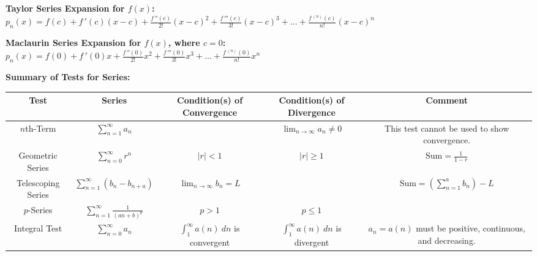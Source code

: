 \noindent\textbf{\large Taylor Series Expansion for $f(x)$:}\\[5pt]
\noindent$\displaystyle p_n(x) = f(c) + f\,'(c)(x-c) + \frac{f\,''(c)}{2!}(x-c)^2 + \frac{f\,'''(c)}{3!}(x-c)^3 + ... + \frac{f\,^{(n)}(c)}{n!}(x-c)^n
$
\baselineskip

\noindent\textbf{\large Maclaurin Series Expansion for $f(x)$, where $c=0$:}\\[5pt]
\noindent$\displaystyle p_n(x) = f(0) + f\,'(0)x + \frac{f\,''(0)}{2!}x^2 + \frac{f\,'''(0)}{3!}x^3 + ... + \frac{f\,^{(n)}(0)}{n!}x^n
$

\clearpage

\noindent\textbf{\large Summary of Tests for Series:}\\[5pt]

\noindent\begin{tabular}{|c|c|c|c|c|}
\hline
Test & Series & \rule[-15pt]{0pt}{33pt}\parbox{1in}{\centering Condition(s) of Convergence} & \parbox{1in}{\centering Condition(s) of Divergence} &   Comment \\ \hline
$n$th-Term & \rule[-15pt]{0pt}{33pt}$\displaystyle{\sum^\infty_{n=1}{a_n}}$ &  & $\displaystyle{\lim_{n \to \infty} a_n \neq 0}$ & \parbox{1.5in}{This test cannot be used to show convergence.}\\ \hline

Geometric Series & \rule[-15pt]{0pt}{33pt}$\displaystyle{\sum^\infty_{n=0}{r^n}}$ & $ \left| r \right| < 1$ & $\left| r \right| \geq 1$ &  $\displaystyle{\text{Sum} = \frac{1}{1-r}}$ \\ \hline

Telescoping Series &\rule[-15pt]{0pt}{33pt} $\displaystyle{\sum^\infty_{n=1}{(b_n-b_{n+a})}}$ & $\displaystyle{\lim_{n \to \infty} b_n = L}$ & & $\displaystyle\text{Sum}= \left(\sum^a_{n=1}b_n\right) -L$ \\ \hline

$p$-Series & \rule[-15pt]{0pt}{33pt}$\displaystyle{\sum^\infty_{n=1}{\frac{1}{(an+b)^p}}}$ & $p>1$ & $p\leq 1$ & \\ \hline

Integral Test & \rule[-20pt]{0pt}{40pt}$\displaystyle{\sum^\infty_{n=0}{a_n}}$ & \rule[-15pt]{0pt}{40pt}\parbox{1in}{\centering$\displaystyle \int_1^\infty a(n)\ dn$\\[3pt] is convergent} & \parbox{1in}{\centering$\displaystyle \int_1^\infty a(n)\ dn$\\[3pt] is divergent} & \parbox{1.2in}{$a_n = a(n)$ must be positive, continuous, and decreasing.}\\ \hline


\end{tabular}
